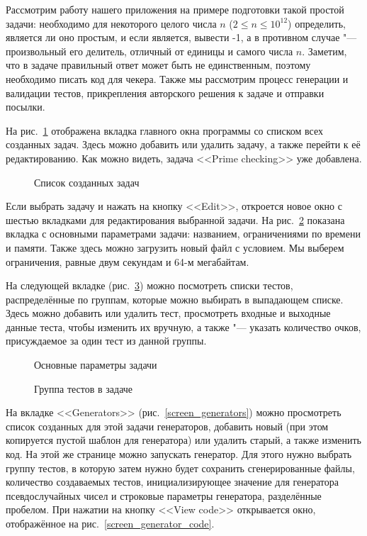 Рассмотрим работу нашего приложения на примере подготовки такой простой задачи: необходимо для некоторого целого числа $n$ ($2 \leq n \leq 10^{12}$) определить, является ли оно простым, и если является, вывести -1, а в противном случае "--- произвольный его делитель, отличный от единицы и самого числа $n$. Заметим, что в задаче правильный ответ может быть не единственным, поэтому необходимо писать код для чекера. Также мы рассмотрим процесс генерации и валидации тестов, прикрепления авторского решения к задаче и отправки посылки.

На рис.~\ref{screen_problems} отображена вкладка главного окна программы со списком всех созданных задач. Здесь можно добавить или удалить задачу, а также перейти к её редактированию. Как можно видеть, задача <<Prime checking>> уже добавлена.

\begin{figure}[h]
\caption{Список созданных задач}
\label{screen_problems}
\end{figure}

Если выбрать задачу и нажать на кнопку <<Edit>>, откроется новое окно с шестью вкладками для редактирования выбранной задачи. На рис.~\ref{screen_problem_param} показана вкладка с основными параметрами задачи: названием, ограничениями по времени и памяти. Также здесь можно загрузить новый файл с условием. Мы выберем ограничения, равные двум секундам и 64-м мегабайтам.

На следующей вкладке (рис.~\ref{screen_tests}) можно посмотреть списки тестов, распределённые по группам, которые можно выбирать в выпадающем списке. Здесь можно добавить или удалить тест, просмотреть входные и выходные данные теста, чтобы изменить их вручную, а также "--- указать количество очков, присуждаемое за один тест из данной группы.

\begin{figure}[!hb]
\caption{Основные параметры задачи}
\label{screen_problem_param}
\end{figure}

\begin{figure}[!hb]
\caption{Группа тестов в задаче}
\label{screen_tests}
\end{figure}

На вкладке <<Generators>> (рис.~\ref{screen_generators}) можно просмотреть список созданных для этой задачи генераторов, добавить новый (при этом копируется пустой шаблон для генератора) или удалить старый, а также изменить код. На этой же странице можно запускать генератор. Для этого нужно выбрать группу тестов, в которую затем нужно будет сохранить сгенерированные файлы, количество создаваемых тестов, инициализирующее значение для генератора псевдослучайных чисел и строковые параметры генератора, разделённые пробелом. При нажатии на кнопку <<View code>> открывается окно, отображённое на рис.~\ref{screen_generator_code}.

